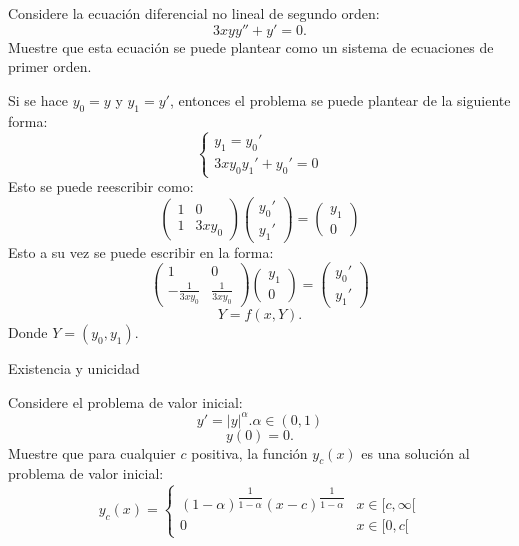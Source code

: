 \begin{frame}
\small
\begin{Eje}
Considere la ecuación diferencial no lineal de segundo orden:
$$3xyy''+y'=0.$$
Muestre que esta ecuación se puede plantear como un sistema de ecuaciones de primer orden.
\end{Eje}
Si se hace $y_0=y$ y $y_1=y'$, entonces el problema se puede plantear de la siguiente forma:
\begin{displaymath}
\left \{
\begin{array}{c}
y_1=y_0'\\
3xy_0y_1'+y_0'=0
\end{array}
\right.
\end{displaymath}
Esto se puede reescribir como:
\begin{displaymath}
\left(
\begin{array}{cc}
1 & 0\\
1 & 3xy_0
\end{array}
\right)
\left(
\begin{array}{c}
y_0'\\
y_1'
\end{array}
\right)=
\left(
\begin{array}{c}
y_1\\
0
\end{array}
\right)
\end{displaymath}
Esto a su vez se puede escribir en la forma:
\begin{displaymath}
\left(
\begin{array}{rr}
1 & 0\\
-\frac{1}{3xy_0} & \frac{1}{3xy_0}
\end{array}
\right)
\left(
\begin{array}{c}
y_1\\
0
\end{array}
\right)=
\left(
\begin{array}{c}
y_0'\\
y_1'
\end{array}
\right)
\end{displaymath}
$$Y=f(x,Y).$$
Donde $Y=(y_0,y_1).$
\end{frame}
\begin{frame}{Existencia y unicidad}
\small
\begin{Eje}
Considere el problema de valor inicial:
$$y'=|y|^\alpha. \alpha\in (0,1)$$
$$y(0)=0.$$
Muestre que para cualquier $c$ positiva, la función $y_c(x)$ es una solución al problema de valor inicial:
\begin{displaymath}
y_c(x)=\left \{
\begin{array}{ll}
(1-\alpha)^{\dfrac{1}{1-\alpha}}(x-c)^{\dfrac{1}{1-\alpha}} & x\in [c,\infty[\\
0 & x\in [0,c[
\end{array}
\right.
\end{displaymath}
\end{Eje}
\end{frame}
